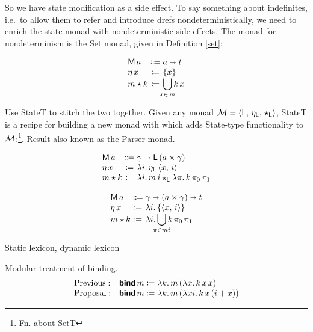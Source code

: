 	So we have state modification as a side effect. To say something about indefinites, i.e.~to allow them to refer and introduce drefs nondeterministically, we need to enrich the state monad with nondeterministic side effects. The monad for nondeterminism is the Set monad, given in Definition \ref{set}:%
	\begin{defi}\label{set}
		\[\begin{array}[t]
			{@{}l@{}c@{}l@{}}
			\textsf{M}\,a &{}\Coloneqq{} &a \ra t%
			\\
			\eta\,x &{}\ceq{} &\{x\}
			\\
			m \star k &{}\ceq{} &\displaystyle\bigcup_{\mathclap{x\in \,m}}k\,x%
		\end{array}\]
	\end{defi} 

	Use StateT to stitch the two together. Given any monad ${\cal M}= \langle \textsf{L},\,\eta_\textsf{L},\,\star_\textsf{L} \rangle$, StateT is a recipe for building a new monad with which adds State-type functionality to ${\cal M}$:\footnote{Fn. about SetT}. Result also known as the Parser monad. \citealt{HuttonMeijer}%
	\begin{defi}\label{statet}
		\[\begin{array}[t]
			{@{}l@{}c@{}l@{}}
			\textsf{M}\,a &{}\Coloneqq{} &\gamma \ra \textsf{L}\,(a \times \gamma)%
			\\
			\eta\,x &{}\ceq{} &\lambda i .\,\eta_\textsf{L}\,\ab{x,\,i}
			\\
			m \star k &{}\ceq{} &\lambda i.\, m\,i\star_\textsf{L} \lambda \pi.\,k\,\pi_0\,\pi_1%
		\end{array}\]
	\end{defi}
	\begin{defi}\label{stateset}
		\[\begin{array}[t]
			{@{}l@{}c@{}l@{}}
			\textsf{M}\,a &{}\Coloneqq{} &\gamma \ra (a \times \gamma) \ra t%
			\\
			\eta\,x &{}\ceq{} &\lambda i.\left\{\ab{x,\,i}\right\}
			\\
			m \star k &{}\ceq{} &\lambda i.\displaystyle\bigcup_{\mathclap{\pi \in mi}}k\,\pi_0\,\pi_1%
		\end{array}\]
	\end{defi}

	Static lexicon, dynamic lexicon
	
	Modular treatment of binding.%
	\[\begin{array}{ll}
		\text{Previous}:& \bsf{bind}\,m \ceq \lambda k.\,m\,(\lambda x.\,k\,x\,x)%
		\\
		\text{Proposal}:& \bsf{bind}\,m \ceq \lambda k.\,m\,(\lambda xi.\,k\,x\,(i + x))%
	\end{array}\]

